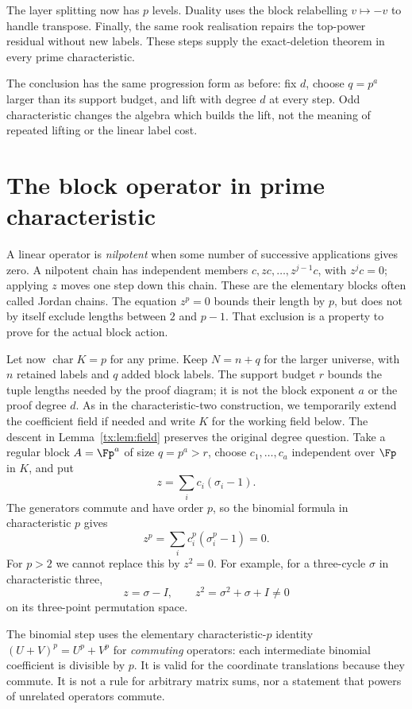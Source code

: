 The layer splitting now has $p$ levels. Duality uses the block
relabelling $v\mapsto-v$ to handle transpose. Finally, the same rook
realisation repairs the top-power residual without new labels.
These steps supply the exact-deletion theorem in every prime
characteristic.

The conclusion has the same progression form as before: fix $d$,
choose $q=p^a$ larger than its support budget, and lift with degree $d$
at every step. Odd characteristic changes the algebra which builds the
lift, not the meaning of repeated lifting or the linear label cost.

\section{The block operator in prime characteristic}
A linear operator is \emph{nilpotent} when some number of successive
applications gives zero. A nilpotent chain has independent members
$c,zc,\ldots,z^{j-1}c$, with $z^jc=0$; applying $z$ moves one step
down this chain. These are the elementary blocks often called Jordan
chains. The equation $z^p=0$ bounds their length by $p$, but does not
by itself exclude lengths between $2$ and $p-1$. That exclusion is
a property to prove for the actual block action.

Let now $\operatorname{char}K=p$ for any prime. Keep $N=n+q$ for the larger universe, with $n$ retained labels and $q$ added block labels. The support budget $r$ bounds the tuple lengths needed by the proof diagram; it is not the block exponent $a$ or the proof degree $d$.
As in the characteristic-two construction, we temporarily extend the
coefficient field if needed and write $K$ for the working field below.
The descent in Lemma~\ref{tx:lem:field} preserves the original degree
question. Take a regular block $A=\Fp^a$ of size $q=p^a>r$, choose
$c_1,\ldots,c_a$ independent over $\Fp$ in $K$, and put
\[z=\sum_i c_i(\sigma_i-1).
\]
The generators commute and have order $p$, so the binomial formula in characteristic $p$ gives
\[z^p=\sum_i c_i^p(\sigma_i^p-1)=0.
\]
For $p>2$ we cannot replace this by $z^2=0$. For example, for a three-cycle $\sigma$ in characteristic three,
\[z=\sigma-I,\qquad z^2=\sigma^2+\sigma+I\ne0
\]
on its three-point permutation space.

The binomial step uses the elementary characteristic-$p$ identity
$(U+V)^p=U^p+V^p$ for \emph{commuting} operators: each intermediate
binomial coefficient is divisible by $p$. It is valid for the coordinate
translations because they commute. It is not a rule for arbitrary
matrix sums, nor a statement that powers of unrelated operators commute.


